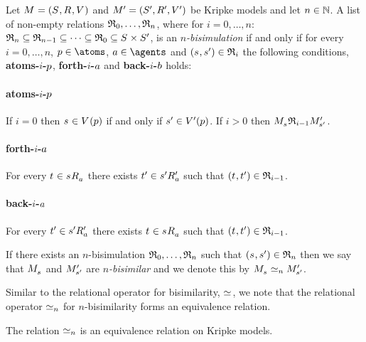 \begin{definition}[$n$-bisimulation]
Let $\kModelAndTuple$ and $\kModelAndTupleP$ be Kripke models and let $n \in \naturals$.
A list of non-empty relations $\bisimulation_0, \dots, \bisimulation_n$, where for $i = 0, \dots, n$: $\bisimulation_n \subseteq \bisimulation_{n - 1} \subseteq \cdots \subseteq \bisimulation_0 \subseteq \kStates \times \kStatesP$, is an {\em $n$-bisimulation} if and only if for every $i = 0, \dots, n$, $\atomP \in \atoms$, $\agentA \in \agents$ and $(\kStateS, \kStateSP) \in \bisimulation_i$ the following conditions, {\bf atoms-$i$-$\atomP$}, {\bf forth-$i$-$\agentA$} and {\bf back-$i$-$\agentB$} holds:

\paragraph{atoms-$i$-$\atomP$}
If $i = 0$ then $\kStateS \in \kValuation(\atomP)$ if and only if $\kStateSP \in \kValuationP(\atomP)$.
If $i > 0$ then $\kPModel{\kStateS} \bisimulation_{i-1} \kPModelP{\kStateSP}$.

\paragraph{forth-$i$-$\agentA$}
For every $\kStateT \in \kSuccessorsA{\kStateS}$ there exists $\kStateTP \in \kSuccessorsPA{\kStateSP}$ such that $(\kStateT, \kStateTP) \in \bisimulation_{i - 1}$.

\paragraph{back-$i$-$\agentA$}
For every $\kStateTP \in \kSuccessorsPA{\kStateSP}$ there exists $\kStateT \in \kSuccessorsA{\kStateS}$ such that $(\kStateT, \kStateTP) \in \bisimulation_{i - 1}$.

If there exists an $n$-bisimulation $\bisimulation_0, \dots, \bisimulation_n$ such that $(\kStateS, \kStateSP) \in \bisimulation_n$ then we say that $\kPModel{\kStateS}$ and $\kPModelP{\kStateSP}$ are {\em $n$-bisimilar} and we denote this by $\kPModel{\kStateS} \bisimilar[n] \kPModelP{\kStateSP}$.
\end{definition}

Similar to the relational operator for bisimilarity, $\bisimilar$, we note that the relational operator $\bisimilar[n]$ for $n$-bisimilarity forms an equivalence relation.

\begin{proposition}
The relation $\bisimilar[n]$ is an equivalence relation on Kripke models.
\end{proposition}

